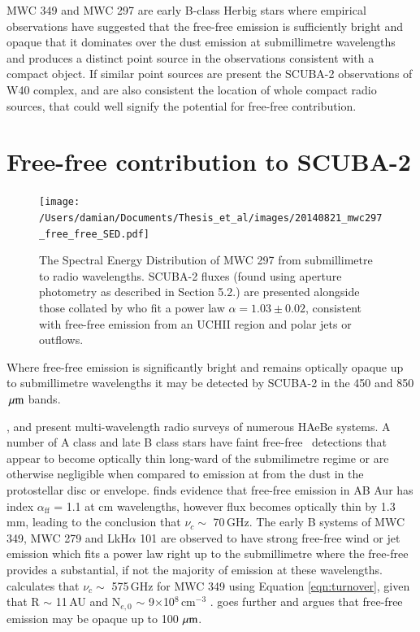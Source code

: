 MWC 349 \citep{Tafoya:2004ly,Sandell:2011dz} and MWC 297 \citep{Sandell:2011dz, Rumble:2015vn} 
are early B-class Herbig stars where empirical observations have suggested that the free-free emission 
is sufficiently bright and opaque that it dominates over the dust emission at submillimetre wavelengths 
and produces a distinct point source in the observations consistent with a compact object. If similar 
point sources are present the SCUBA-2 observations of W40 complex, and are also consistent the 
location of whole compact radio sources, that could well signify the potential for free-free contribution.



\section{Free-free contribution to SCUBA-2}

\begin{figure}
\begin{center}
\texttt{[image: /Users/damian/Documents/Thesis\_et\_al/images/20140821\_mwc297\_free\_free\_SED.pdf]}
\caption{The Spectral Energy Distribution of MWC 297 from submillimetre to radio wavelengths. SCUBA-2 fluxes (found using aperture photometry as described in Section 5.2.) are presented alongside those collated by \protect\cite{Sandell:2011dz} who fit a power law $\alpha = 1.03\pm0.02$, consistent with free-free emission from an UCH\textrm{II} region and polar jets or outflows.}
\label{fig:freefreeSED}
\end{center}
\end{figure}

Where free-free emission is significantly bright and remains optically opaque up to submillimetre wavelengths it may be detected by SCUBA-2 in the 450 and 850\,$\,\mu\rm{m}$ bands.  

\cite{Harvey:1979qf}, \cite{Kurtz:1994cr} and \cite{Sandell:2011dz} present multi-wavelength radio surveys of numerous HAeBe systems. A number of A class and late B class stars have faint free-free \UCHII\ detections that appear to become optically thin long-ward of the submilimetre regime or are otherwise negligible when compared to emission at from the dust in the protostellar disc or envelope. \cite{Rodriguez:2014zr} finds evidence that free-free emission in AB Aur has index $\alpha_{\mathrm{ff}}$ = 1.1 at cm wavelengths, however flux becomes optically thin by 1.3\,mm, leading to the conclusion that  $\nu_{c} \sim$ 70\,GHz. The early B systems of MWC 349, MWC 279 and LkH$\alpha$ 101 are observed to have strong free-free wind or jet emission which fits a power law right up to the submillimetre where the free-free provides a substantial, if not the majority of emission at these wavelengths. \cite{Olnon:1975bh} calculates that $\nu_{c} \sim$ 575\,GHz for MWC 349 using Equation \ref{eqn:turnover}, given that R $\sim$ 11\,AU and N$_{e,0}$ $\sim$ 9$\times$10$^{8}$\,cm$^{-3}$ \citep{Greenstein:1973uq}. \cite{Harvey:1979qf} goes further and argues that free-free emission may be opaque up to 100\,$\,\mu\rm{m}$.

